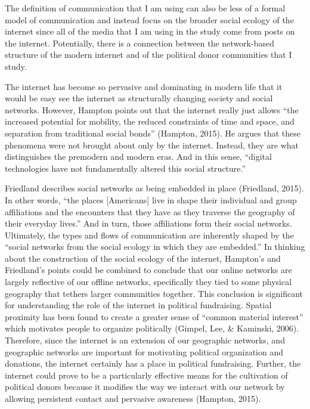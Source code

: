 \documentclass[12pt,]{article}
\begin{document}
The definition of communication that I am using can also be less of a
formal model of communication and instead focus on the broader social
ecology of the internet since all of the media that I am using in the
study come from posts on the internet. Potentially, there is a
connection between the network-based structure of the modern internet
and of the political donor communities that I study.

The internet has become so pervasive and dominating in modern life that
it would be easy see the internet as structurally changing society and
social networks. However, Hampton points out that the internet really
just allows ``the increased potential for mobility, the reduced
constraints of time and space, and separation from traditional social
bonds'' (Hampton, 2015). He argues that these phenomena were not brought
about only by the internet. Instead, they are what distinguishes the
premodern and modern eras. And in this sense, ``digital technologies
have not fundamentally altered this social structure.''

Friedland describes social networks as being embedded in place
(Friedland, 2015). In other words, ``the places {[}Americans{]} live in
shape their individual and group affiliations and the encounters that
they have as they traverse the geography of their everyday lives.'' And
in turn, those affiliations form their social networks. Ultimately, the
types and flows of communication are inherently shaped by the ``social
networks from the social ecology in which they are embedded.'' In
thinking about the construction of the social ecology of the internet,
Hampton's and Friedland's points could be combined to conclude that our
online networks are largely reflective of our offline networks,
specifically they tied to some physical geography that tethers larger
communities together. This conclusion is significant for understanding
the role of the internet in political fundraising. Spatial proximity has
been found to create a greater sense of ``common material interest''
which motivates people to organize politically (Gimpel, Lee, \&
Kaminski, 2006). Therefore, since the internet is an extension of our
geographic networks, and geographic networks are important for
motivating political organization and donations, the internet certainly
has a place in political fundraising. Further, the internet could prove
to be a particularly effective means for the cultivation of political
donors because it modifies the way we interact with our network by
allowing persistent contact and pervasive awareness (Hampton, 2015).
\end{document}
